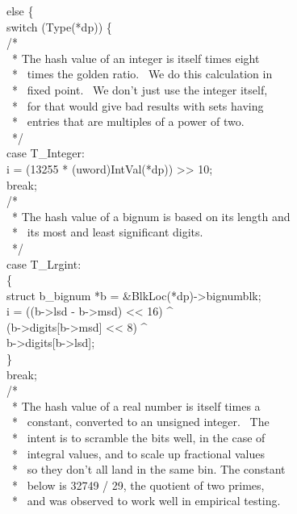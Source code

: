 \begin{iconcode}
\>else \{\\
\>\>switch (Type(*dp)) \{\\
\>\>\>/*\\
\>\>\>\ * The hash value of an integer is itself times eight \\
\>\>\>\ * \ times the golden ratio. \ We do this calculation in \\
\>\>\>\ * \ fixed point. \ We don't just use the integer itself, \\
\>\>\>\ * \ for that would give bad results with sets having\\
\>\>\>\ * \ entries that are multiples of a power of two.\\
\>\>\>\ */\\
\>\>\>case T\_Integer:\\
\>\>\>\>i = (13255 * (uword)IntVal(*dp)) >> 10;\\
\>\>\>\>break;\\
\>\>\>/*\\
\>\>\>\ * The hash value of a bignum is based on its length and \\
\>\>\>\ * \ its most and least significant digits.\\
\>\>\>\ */\\
\>\>case T\_Lrgint:\\
\>\>\>\{\\
\>\>\>struct b\_bignum *b = \&BlkLoc(*dp)->bignumblk;\\
\>\>\>i = ((b->lsd - b->msd) <{}< 16) \^{}\\
\>\>\>\>(b->digits[b->msd] <{}< 8) \^{}\\
\>\>\>\>b->digits[b->lsd];\\
\>\>\>\}\\
\>\>\>break;\\
\>\>\>/*\\
\>\>\>\ * The hash value of a real number is itself times a \\
\>\>\>\ * \ constant, converted to an unsigned integer. \ The \\
\>\>\>\ * \ intent is to scramble the bits well, in the case of \\
\>\>\>\ * \ integral values, and to scale up fractional values \\
\>\>\>\ * \ so they don't all land in the same bin. The constant\\
\>\>\>\ * \ below is 32749 / 29, the quotient of two primes,\\
\>\>\>\ * \ and was observed to work well in empirical testing.\\

\end{iconcode}
